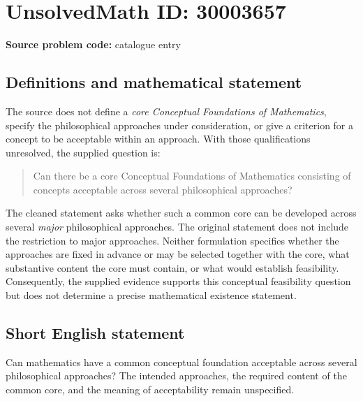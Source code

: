\documentclass[11pt]{article}
\begin{document}
\section*{UnsolvedMath ID: 30003657}
\textbf{Source problem code:} catalogue entry
\subsection{Definitions and mathematical statement}
The source does not define a \emph{core Conceptual Foundations of Mathematics}, specify the philosophical approaches under consideration, or give a criterion for a concept to be acceptable within an approach. With those qualifications unresolved, the supplied question is:
\begin{quote}
Can there be a core Conceptual Foundations of Mathematics consisting of concepts acceptable across several philosophical approaches?
\end{quote}
The cleaned statement asks whether such a common core can be developed across several \emph{major} philosophical approaches. The original statement does not include the restriction to major approaches. Neither formulation specifies whether the approaches are fixed in advance or may be selected together with the core, what substantive content the core must contain, or what would establish feasibility. Consequently, the supplied evidence supports this conceptual feasibility question but does not determine a precise mathematical existence statement.
\subsection{Short English statement}
Can mathematics have a common conceptual foundation acceptable across several philosophical approaches? The intended approaches, the required content of the common core, and the meaning of acceptability remain unspecified.
\end{document}

